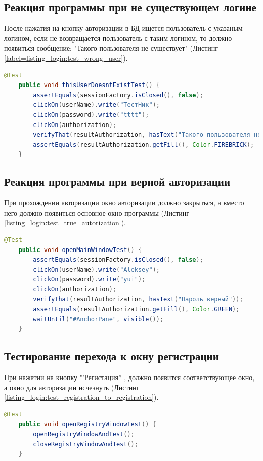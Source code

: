 \documentclass[a4paper,12pt]{article}
\begin{document}
\subsection{Реакция программы при не существующем логине}
После нажатия на кнопку авторизации в БД ищется пользователь с указаным логином, если не возвращается пользователь с таким логином, то должно появиться сообщение: "Такого пользователя не существует" (Листинг \ref{label=listing_login:test_wrong_user}).
\begin{lstlisting}[language=java, caption=Тестирование ввода неверного пароля, label=listing_login:test_wrong_user]
    @Test
    public void thisUserDoesntExistTest() {
        assertEquals(sessionFactory.isClosed(), false);
        clickOn(userName).write("ТестНик");
        clickOn(password).write("tttt");
        clickOn(authorization);
        verifyThat(resultAuthorization, hasText("Такого пользователя не существует"));
        assertEquals(resultAuthorization.getFill(), Color.FIREBRICK);
    }
\end{lstlisting}


\subsection{Реакция программы при верной авторизации}
При прохождении авторизации окно авторизации должно закрыться, а вместо него должно появиться основное окно программы (Листинг \ref{listing_login:test_true_autorization}). 

\begin{lstlisting}[language=java, caption=Тестирование прохождения авторизации, label=listing_login:test_true_autorization]
    @Test
    public void openMainWindowTest() {
        assertEquals(sessionFactory.isClosed(), false);
        clickOn(userName).write("Aleksey");
        clickOn(password).write("yui");
        clickOn(authorization);
        verifyThat(resultAuthorization, hasText("Пароль верный"));
        assertEquals(resultAuthorization.getFill(), Color.GREEN);
        waitUntil("#AnchorPane", visible());
    }
\end{lstlisting}

\subsection{Тестирование перехода к окну регистрации}
При нажатии на кнопку "'Регистация'' , должно появится соответствующее окно, а окно для авторизации исчезнуть (Листинг \ref{listing_login:test_registration_to_registration}). 
\begin{lstlisting}[language=java, caption=Тестирование перехода к окну регистрации, label=listing_login:test_registration_to_registration]
    @Test
    public void openRegistryWindowTest() {
        openRegistryWindowAndTest();
        closeRegistryWindowAndTest();
    }
\end{lstlisting}
\end{document}
